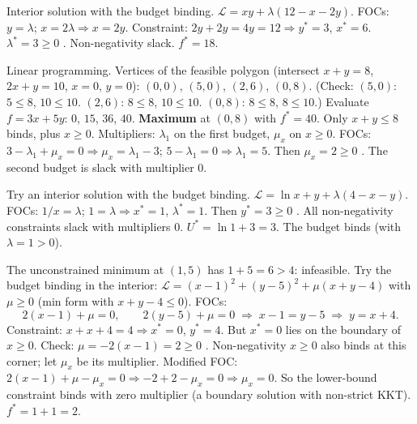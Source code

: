 \begin{solutions}
  \item Interior solution with the budget binding.
        $\mathcal{L} = x y + \lambda(12 - x - 2 y)$. FOCs: $y = \lambda$;
        $x = 2 \lambda \Rightarrow x = 2 y$. Constraint:
        $2 y + 2 y = 4 y = 12 \Rightarrow y^* = 3$, $x^* = 6$.
        $\lambda^* = 3 \geq 0$ \checkmark. Non-negativity slack.
        $f^* = 18$.

  \item Linear programming. Vertices of the feasible polygon (intersect
        $x + y = 8$, $2 x + y = 10$, $x = 0$, $y = 0$): $(0, 0)$,
        $(5, 0)$, $(2, 6)$, $(0, 8)$. (Check: $(5, 0)$: $5 \leq 8$,
        $10 \leq 10$. $(2, 6)$: $8 \leq 8$, $10 \leq 10$. $(0, 8)$:
        $8 \leq 8$, $8 \leq 10$.) Evaluate $f = 3 x + 5 y$: $0$, $15$,
        $36$, $40$. \textbf{Maximum} at $(0, 8)$ with $f^* = 40$. Only
        $x + y \leq 8$ binds, plus $x \geq 0$. Multipliers: $\lambda_1$ on
        the first budget, $\mu_x$ on $x \geq 0$. FOCs:
        $3 - \lambda_1 + \mu_x = 0 \Rightarrow \mu_x = \lambda_1 - 3$;
        $5 - \lambda_1 = 0 \Rightarrow \lambda_1 = 5$. Then
        $\mu_x = 2 \geq 0$ \checkmark. The second budget is slack with
        multiplier $0$.

  \item Try an interior solution with the budget binding.
        $\mathcal{L} = \ln x + y + \lambda(4 - x - y)$. FOCs:
        $1/x = \lambda$; $1 = \lambda \Rightarrow x^* = 1$,
        $\lambda^* = 1$. Then $y^* = 3 \geq 0$ \checkmark. All
        non-negativity constraints slack with multipliers $0$.
        $U^* = \ln 1 + 3 = 3$. The budget binds (with
        $\lambda = 1 > 0$).

  \item The unconstrained minimum at $(1, 5)$ has $1 + 5 = 6 > 4$:
        infeasible. Try the budget binding in the interior:
        $\mathcal{L} = (x - 1)^2 + (y - 5)^2 + \mu(x + y - 4)$ with
        $\mu \geq 0$ (min form with $x + y - 4 \leq 0$). FOCs:
        \[
          2(x - 1) + \mu = 0, \qquad 2(y - 5) + \mu = 0
          \;\Rightarrow\; x - 1 = y - 5 \;\Rightarrow\; y = x + 4 .
        \]
        Constraint: $x + x + 4 = 4 \Rightarrow x^* = 0$, $y^* = 4$. But
        $x^* = 0$ lies on the boundary of $x \geq 0$. Check:
        $\mu = -2(x - 1) = 2 \geq 0$ \checkmark. Non-negativity
        $x \geq 0$ also binds at this corner; let $\mu_x$ be its
        multiplier. Modified FOC:
        $2(x - 1) + \mu - \mu_x = 0 \Rightarrow -2 + 2 - \mu_x = 0
        \Rightarrow \mu_x = 0$. So the lower-bound constraint binds with
        zero multiplier (a boundary solution with non-strict KKT).
        $f^* = 1 + 1 = 2$.


\end{solutions}
